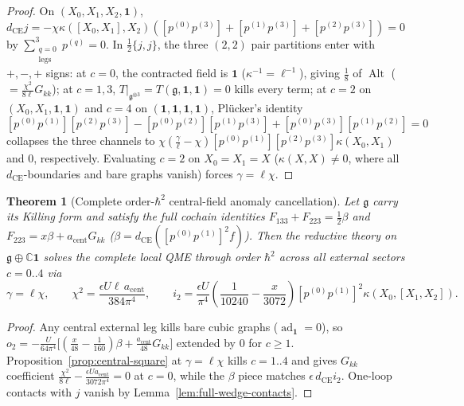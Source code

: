 \documentclass[11pt,letterpaper]{article}
\numberwithin{equation}{section}
\theoremstyle{plain}
\newtheorem{theorem}{Theorem}[section]
\theoremstyle{definition}
\theoremstyle{remark}
\newcommand{\fg}{\mathfrak{g}}
\newcommand{\Alt}{\operatorname{Alt}}
\begin{document}
\begin{proof}
On $(X_0,X_1,X_2,\mathbf{1})$, $d_{\mathrm{CE}}j = -\chi\kappa([X_0,X_1],X_2)([p^{(0)}p^{(3)}]+[p^{(1)}p^{(3)}]+[p^{(2)}p^{(3)}]) = 0$ by $\sum_{\substack{q=0\\\mathrm{legs}}}^3 p^{(q)} = 0$. In $\frac{1}{2}\{j, j\}$, the three $(2,2)$ pair partitions enter with $+,-,+$ signs: at $c = 0$, the contracted field is $\mathbf{1}$ ($\kappa^{-1} = \ell^{-1}$), giving $\frac{1}{8}$ of $\Alt$ ($= \frac{\chi^2}{8\ell}G_{kk}$); at $c = 1,3$, $T|_{\fg^{\otimes 3}} = T(\fg,\mathbf{1},\mathbf{1}) = 0$ kills every term; at $c = 2$ on $(X_0,X_1,\mathbf{1},\mathbf{1})$ and $c = 4$ on $(\mathbf{1},\mathbf{1},\mathbf{1},\mathbf{1})$, Pl\"ucker's identity $[p^{(0)}p^{(1)}][p^{(2)}p^{(3)}] - [p^{(0)}p^{(2)}][p^{(1)}p^{(3)}] + [p^{(0)}p^{(3)}][p^{(1)}p^{(2)}] = 0$ collapses the three channels to $\chi(\frac{\gamma}{\ell}-\chi)[p^{(0)}p^{(1)}][p^{(2)}p^{(3)}]\kappa(X_0,X_1)$ and $0$, respectively. Evaluating $c = 2$ on $X_0 = X_1 = X$ ($\kappa(X,X) \neq 0$, where all $d_{\mathrm{CE}}$-boundaries and bare graphs vanish) forces $\gamma = \ell\chi$.
\end{proof}

\begin{theorem}[Complete order-$\hbar^2$ central-field anomaly cancellation]
\label{thm:central-cancel}
Let $\fg$ carry its Killing form and satisfy the full cochain identities $F_{133} + F_{223} = \frac{1}{2}\beta$ and $F_{223} = x\beta + a_{\mathrm{cent}}G_{kk}$ ($\beta = d_{\mathrm{CE}}([p^{(0)}p^{(1)}]^2 f)$). Then the reductive theory on $\fg \oplus \mathbb{C}\mathbf{1}$ solves the complete local QME through order $\hbar^2$ across all external sectors $c = 0..4$ via
\begin{equation}
\label{eq:central-solution-master}
\gamma = \ell\chi, \qquad \chi^2 = \frac{\epsilon U\ell\,a_{\mathrm{cent}}}{384\pi^4}, \qquad
i_2 = \frac{\epsilon U}{\pi^4}\left(\frac{1}{10240} - \frac{x}{3072}\right)[p^{(0)}p^{(1)}]^2\kappa(X_0,[X_1,X_2]).
\end{equation}
\end{theorem}

\begin{proof}
Any central external leg kills bare cubic graphs ($\operatorname{ad}_{\mathbf{1}} = 0$), so $o_2 = -\frac{U}{64\pi^4}\big[(\frac{x}{48}-\frac{1}{160})\beta + \frac{a_{\mathrm{cent}}}{48}G_{kk}\big]$ extended by $0$ for $c \ge 1$. Proposition~\ref{prop:central-square} at $\gamma = \ell\chi$ kills $c = 1..4$ and gives $G_{kk}$ coefficient $\frac{\chi^2}{8\ell} - \frac{\epsilon U a_{\mathrm{cent}}}{3072\pi^4} = 0$ at $c = 0$, while the $\beta$ piece matches $\epsilon\,d_{\mathrm{CE}}i_2$. One-loop contacts with $j$ vanish by Lemma~\ref{lem:full-wedge-contacts}.
\end{proof}
\end{document}
